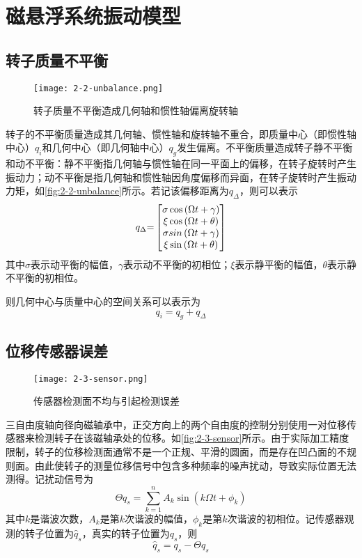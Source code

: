 \documentclass[
  lang=cn,
  degree=master,
  openany,oneside
]{nuaathesis}
\begin{document}
\section{磁悬浮系统振动模型}
\subsection{转子质量不平衡}
\begin{figure}[h!]
	\texttt{[image: 2-2-unbalance.png]}
	\caption{转子质量不平衡造成几何轴和惯性轴偏离旋转轴}
	\label{fig:2-2-unbalance}
\end{figure}

转子的不平衡质量造成其几何轴、惯性轴和旋转轴不重合，即质量中心（即惯性轴中心）$ q_i $和几何中心（即几何轴中心）$ q_g $发生偏离。不平衡质量造成转子静不平衡和动不平衡：静不平衡指几何轴与惯性轴在同一平面上的偏移，在转子旋转时产生振动力；动不平衡是指几何轴和惯性轴因角度偏移而异面，在转子旋转时产生振动力矩，如\autoref{fig:2-2-unbalance}所示。若记该偏移距离为$ q_{\Delta} $，则可以表示
\begin{equation}
\label{eq:q_delta}
{{q}_\Delta }{ = }\left[ 
{\begin{matrix}
   {\sigma \cos \left( {\Omega t + \gamma } \right)}  \cr 
   {\xi \cos \left( {\Omega t + \theta } \right)}  \cr 
   {\sigma sin\left( {\Omega t + \gamma } \right)}  \cr 
   {\xi \sin \left( {\Omega t + \theta } \right)}  \cr 
\end{matrix}} 
 \right]
\end{equation}
其中$\sigma$表示动平衡的幅值，$\gamma$表示动不平衡的初相位；$\xi$表示静平衡的幅值，$\theta$表示静不平衡的初相位。

则几何中心与质量中心的空间关系可以表示为
\begin{equation}
{{q}_i}{ = }{{q}_{g}} + {{q}_\Delta }
\end{equation}

\subsection{位移传感器误差}

\begin{figure}[h!]
	\texttt{[image: 2-3-sensor.png]}
	\caption{传感器检测面不均与引起检测误差}
	\label{fig:2-3-sensor}
\end{figure}

三自由度轴向径向磁轴承中，正交方向上的两个自由度的控制分别使用一对位移传感器来检测转子在该磁轴承处的位移。如\autoref{fig:2-3-sensor}所示。由于实际加工精度限制，转子的位移检测面通常不是一个正规、平滑的圆面，而是存在凹凸面的不规则面。由此使转子的测量位移信号中包含多种频率的噪声扰动，导致实际位置无法测得。记扰动信号为
\begin{equation}
\Theta {{q}_s} = \sum\limits_{k = 1}^n {{A_k}\sin \left( {k\Omega t + {\phi _k}} \right)} 
\end{equation}
其中$k$是谐波次数，$A_k$是第$k$次谐波的幅值，$\phi _k$是第$k$次谐波的初相位。记传感器观测的转子位置为${\hat q}_s$，真实的转子位置为$q_s$，则
\begin{equation}
{{\hat q}_s} = {{q}_s} - \Theta {{q}_s}
\end{equation}
\end{document}
